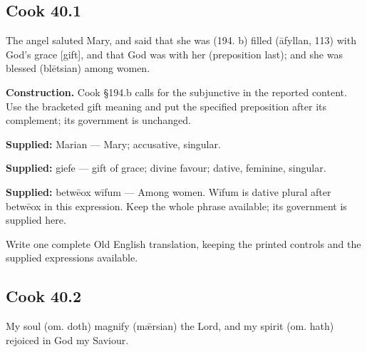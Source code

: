 \par\begin{minipage}{\linewidth}\raggedright
\subsection*{Cook 40.1}

The angel saluted Mary, and said that she was (194. b) filled (āfyllan, 113) with God’s grace [gift], and that God was with her (preposition last); and she was blessed (blētsian) among women.

\textbf{Construction.} Cook §194.b calls for the subjunctive in the reported content. Use the bracketed gift meaning and put the specified preposition after its complement; its government is unchanged.

\end{minipage}\par\addvspace{4pt}

\textbf{Supplied:} Marian — Mary; accusative, singular.

\textbf{Supplied:} giefe — gift of grace; divine favour; dative, feminine, singular.

\textbf{Supplied:} betwēox wīfum — Among women. Wīfum is dative plural after betwēox in this expression. Keep the whole phrase available; its government is supplied here.

Write one complete Old English translation, keeping the printed controls and the supplied expressions available.

\par\begin{minipage}{\linewidth}\raggedright
\subsection*{Cook 40.2}

My soul (om. doth) magnify (mǣrsian) the Lord, and my spirit (om. hath) rejoiced in God my Saviour.

\end{minipage}\par\addvspace{4pt}

